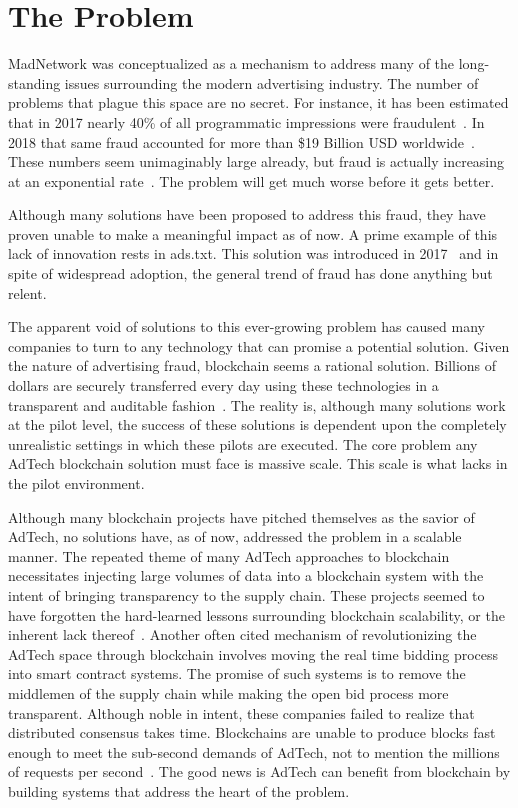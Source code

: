\section{The Problem}
MadNetwork was conceptualized as a mechanism to address many of the
long-standing issues surrounding the modern advertising industry.
The number of problems that plague this space are no secret.
For instance, it has been estimated that in 2017 nearly 40\%  of all
programmatic impressions were fraudulent~\cite{DigitalAdFraud2018}.
In 2018 that same fraud accounted for more than \$19 Billion USD
worldwide~\cite{DigitalAdFraud2018}.
These numbers seem unimaginably large already, but fraud is actually
increasing at an exponential rate~\cite{DigitalAdFraud2018}.
The problem will get much worse before it gets better.

Although many solutions have been proposed to address this fraud, they
have proven unable to make a meaningful impact as of now.
A prime example of this lack of innovation rests in ads.txt.
This solution was introduced in 2017~\cite{IABAdsTxt}
and in spite of widespread adoption, the general trend of
fraud has done anything but relent.

The apparent void of solutions to this ever-growing problem has caused
many companies to turn to any technology that can promise a potential solution.
Given the nature of advertising fraud, blockchain seems a rational solution.
Billions of dollars are securely transferred every day using these
technologies in a transparent and auditable fashion~\cite{EthDVT}.
The reality is, although many solutions work at the pilot level, the
success of these solutions is dependent upon the completely unrealistic
settings in which these pilots are executed.
The core problem any AdTech blockchain solution must face is massive scale.
This scale is what lacks in the pilot environment.

Although many blockchain projects have pitched themselves as the savior
of AdTech, no solutions have, as of now, addressed the problem in a
scalable manner.
The repeated theme of many AdTech approaches to blockchain necessitates
injecting large volumes of data into a blockchain system with the
intent of bringing transparency to the supply chain.
These projects seemed to have forgotten the hard-learned lessons
surrounding blockchain scalability, or the inherent
lack thereof~\cite{BlockchainScaling}.
Another often cited mechanism of revolutionizing the AdTech space
through blockchain involves moving the real time bidding process into
smart contract systems.
The promise of such systems is to remove the middlemen of the supply
chain while making the open bid process more transparent.
Although noble in intent, these companies failed to realize that
distributed consensus takes time.
Blockchains are unable to produce blocks fast enough to meet the
sub-second demands of AdTech, not to mention the millions of requests
per second~\cite{BlockchainTPS}.
The good news is AdTech can benefit from blockchain by building systems
that address the heart of the problem.

